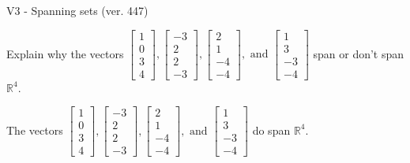 \begin{exercise}
  \begin{exerciseTitle}V3 - Spanning sets (ver. 447)\end{exerciseTitle}
  \begin{exerciseStatement}
    Explain why the vectors \(\left[\begin{array}{r}
1 \\
0 \\
3 \\
4
\end{array}\right] , \left[\begin{array}{r}
-3 \\
2 \\
2 \\
-3
\end{array}\right] , \left[\begin{array}{r}
2 \\
1 \\
-4 \\
-4
\end{array}\right] , \text{ and } \left[\begin{array}{r}
1 \\
3 \\
-3 \\
-4
\end{array}\right]\) span or don't span \(\mathbb{R}^4\). 
	


  \end{exerciseStatement}
  \begin{exerciseAnswer}
   The vectors \(\left[\begin{array}{r}
1 \\
0 \\
3 \\
4
\end{array}\right] , \left[\begin{array}{r}
-3 \\
2 \\
2 \\
-3
\end{array}\right] , \left[\begin{array}{r}
2 \\
1 \\
-4 \\
-4
\end{array}\right] , \text{ and } \left[\begin{array}{r}
1 \\
3 \\
-3 \\
-4
\end{array}\right]\) 
  	 do  
	span \(\mathbb{R}^4\).
  


  \end{exerciseAnswer}
\end{exercise}